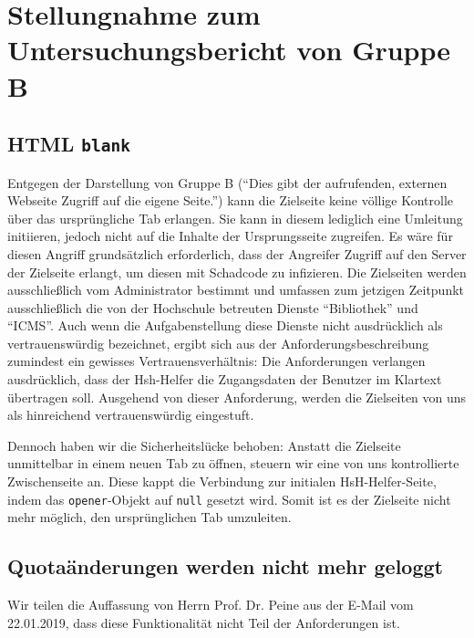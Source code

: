 \documentclass[12pt,DIV14,BCOR10mm,a4paper,parskip=half-,headsepline,headinclude,english,ngerman,bibliography=totocnumbered]{scrreprt}
\begin{document}
\vspace*{-3cm}

\tableofcontents  %

\chapter{Stellungnahme zum Untersuchungsbericht von Gruppe B}

\section{HTML \texttt{blank}}

Entgegen der Darstellung von Gruppe B (\enquote{Dies gibt der aufrufenden, externen Webseite Zugriff auf die eigene Seite.}) kann die Zielseite keine völlige Kontrolle über das ursprüngliche Tab erlangen.
Sie kann in diesem lediglich eine Umleitung initiieren, jedoch nicht auf die Inhalte der Ursprungsseite zugreifen. Es wäre für diesen Angriff grundsätzlich erforderlich, dass der Angreifer Zugriff auf den Server der Zielseite erlangt, um diesen mit Schadcode zu infizieren. Die Zielseiten werden ausschließlich vom Administrator bestimmt und umfassen zum jetzigen Zeitpunkt ausschließlich die von der Hochschule betreuten Dienste \enquote{Bibliothek} und \enquote{ICMS}. Auch wenn die Aufgabenstellung diese Dienste nicht ausdrücklich als vertrauenswürdig bezeichnet, ergibt sich aus der Anforderungsbeschreibung zumindest ein gewisses Vertrauensverhältnis: Die Anforderungen verlangen ausdrücklich, dass der Hsh-Helfer die Zugangsdaten der Benutzer im Klartext übertragen soll. Ausgehend von dieser Anforderung, werden die Zielseiten von uns als hinreichend vertrauenswürdig eingestuft.

Dennoch haben wir die Sicherheitslücke behoben: Anstatt die Zielseite unmittelbar in einem neuen Tab zu öffnen, steuern wir eine von uns kontrollierte Zwischenseite an. Diese kappt die Verbindung zur initialen HsH-Helfer-Seite, indem das \texttt{opener}-Objekt auf \texttt{null} gesetzt wird.
Somit ist es der Zielseite nicht mehr möglich, den ursprünglichen Tab umzuleiten.

\section{Quotaänderungen werden nicht mehr geloggt}

Wir teilen die Auffassung von Herrn Prof. Dr. Peine aus der E-Mail vom 22.01.2019, dass diese Funktionalität nicht Teil der Anforderungen ist.
\end{document}
